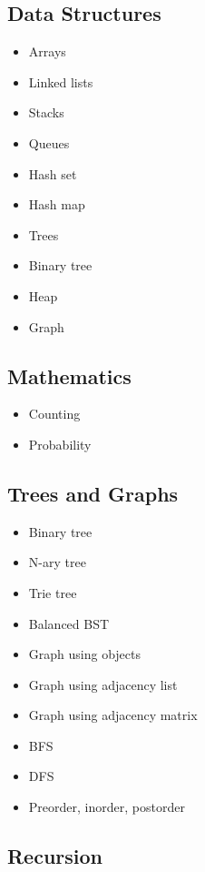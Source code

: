 \documentclass{article}
\begin{document}
\subsection{Data Structures}
\begin{itemize}
    \item Arrays
    \item Linked lists
    \item Stacks
    \item Queues
    \item Hash set
    \item Hash map
    \item Trees
    \item Binary tree
    \item Heap
    \item Graph
\end{itemize}

\subsection{Mathematics}
\begin{itemize}
    \item Counting
    \item Probability
\end{itemize}

\subsection{Trees and Graphs}
\begin{itemize}
    \item Binary tree
    \item N-ary tree
    \item Trie tree
    \item Balanced BST
    \item Graph using objects
    \item Graph using adjacency list
    \item Graph using adjacency matrix
    \item BFS
    \item DFS
    \item Preorder, inorder, postorder
\end{itemize}

\subsection{Recursion}
\end{document}
